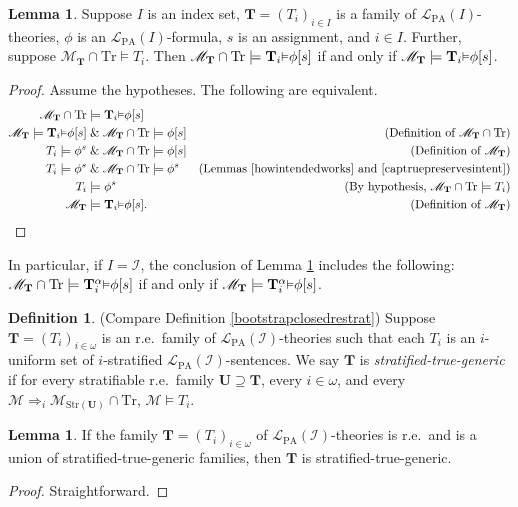 \documentclass[reqno]{article}
\theoremstyle{definition}
\newtheorem{lemma}[theorem]{Lemma}
\newtheorem{definition}[theorem]{Definition}
\def\L{\mathscr{L}}
\def\M{\mathscr{M}}
\def\T{\mathbf{T}}
\def\U{\mathbf{U}}
\def\LPA{\L_{\mathrm{PA}}}
\def\indset{\mathcal I}
\def\Tr{\mathrm{Tr}}
\def\ctr{\cap\Tr}
\def\myequiv{\Rightarrow}
\renewcommand{\Pr}[1]{\T_{#1}\mbox{\small${\vDash}$}}
\newcommand{\Prr}[2]{\T^{#1}_{#2}\mbox{\small${\vDash}$}}
\newcommand{\str}[1]{\mathrm{Str}(#1)} \newcommand{\Str}[1]{\str{#1}}
\begin{document}
\begin{lemma}
\label{captragrees}
Suppose $I$ is an index set,
$\T=(T_i)_{i\in I}$ is a family of $\LPA(I)$-theories,
$\phi$ is an $\LPA(I)$-formula, $s$ is an assignment, and $i\in I$.
Further, suppose $\M_\T\ctr\models T_i$.
Then $\M_\T\ctr\models\Pr i\phi[s]$ if and only if $\M_\T\models\Pr i\phi[s]$.
\end{lemma}

\begin{proof}
Assume the hypotheses.  The following are equivalent.
\begin{align*}
\M_\T\ctr &\models \Pr i\phi[s]\\
\M_\T \models \Pr i\phi[s] &\mathrel\& \M_\T\ctr\models \phi[s]
  &\mbox{(Definition of $\M_\T\ctr$)}\\
T_i \models \phi^s &\mathrel\& \M_\T\ctr\models \phi[s]
  &\mbox{(Definition of $\M_\T$)}\\
T_i \models \phi^s &\mathrel\& \M_\T\ctr\models \phi^s
  &\mbox{(Lemmas \ref{howintendedworks} and \ref{captruepreservesintent})}\\
T_i &\models \phi^s
  &\mbox{(By hypothesis, $\M_\T\ctr\models T_i$)}\\
\M_\T &\models \Pr i\phi[s].
  &\mbox{(Definition of $\M_\T$)}
\end{align*}
\end{proof}

In particular, if $I=\indset$, the conclusion of Lemma \ref{captragrees}
includes the following: $\M_\T\ctr\models\Prr\alpha i\phi[s]$ if and only if
$\M_\T\models\Prr\alpha i\phi[s]$.


\begin{definition}
(Compare Definition \ref{bootstrapclosedrestrat})
Suppose $\T=(T_i)_{i\in\omega}$ is an r.e.~family of $\LPA(\indset)$-theories
such that each $T_i$ is an $i$-uniform set of $i$-stratified $\LPA(\indset)$-sentences.
We say $\T$ is \emph{stratified-true-generic} if for every stratifiable r.e.~family
$\U\supseteq\T$, every $i\in\omega$, and every $\M\myequiv_i\M_{\str\U}\ctr$, $\M\models T_i$.
\end{definition}

\begin{lemma}
If the family $\T=(T_i)_{i\in\omega}$ of $\LPA(\indset)$-theories is r.e.~and is a union of stratified-true-generic families,
then $\T$ is stratified-true-generic.
\end{lemma}

\begin{proof}
Straightforward.
\end{proof}
\end{document}
